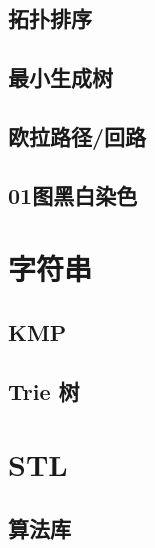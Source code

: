 \documentclass{article}
\begin{document}


\subsection{拓扑排序}



\subsection{最小生成树}

\subsection{欧拉路径/回路}

\subsection{01图黑白染色}

\section{字符串}

\subsection{KMP}

\subsection{Trie 树}

\section{STL}

\subsection{算法库}


\end{document}
